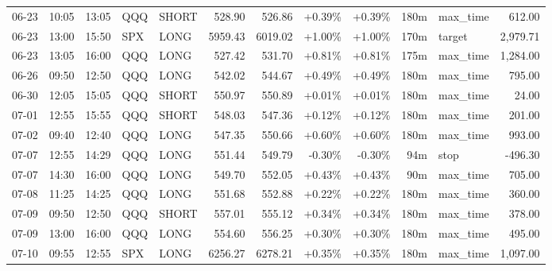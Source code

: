 \documentclass[11pt,a4paper,twoside]{article}
\begin{document}
\begin{center}
\begin{longtable}{>{\color{txtmain}}l l l l l r r r r r >{\color{txtmain}}l r}
06-23 & 10:05 & 13:05 & QQQ & SHORT & 528.90 & 526.86 & \textcolor{wingreen}{+0.39\%} & \textcolor{wingreen}{+0.39\%} & 180m & max\_time & \textcolor{wingreen}{612.00} \\
06-23 & 13:00 & 15:50 & SPX & LONG & 5959.43 & 6019.02 & \textcolor{wingreen}{+1.00\%} & \textcolor{wingreen}{+1.00\%} & 170m & target & \textcolor{wingreen}{2,979.71} \\
06-23 & 13:05 & 16:00 & QQQ & LONG & 527.42 & 531.70 & \textcolor{wingreen}{+0.81\%} & \textcolor{wingreen}{+0.81\%} & 175m & max\_time & \textcolor{wingreen}{1,284.00} \\
06-26 & 09:50 & 12:50 & QQQ & LONG & 542.02 & 544.67 & \textcolor{wingreen}{+0.49\%} & \textcolor{wingreen}{+0.49\%} & 180m & max\_time & \textcolor{wingreen}{795.00} \\
06-30 & 12:05 & 15:05 & QQQ & SHORT & 550.97 & 550.89 & \textcolor{wingreen}{+0.01\%} & \textcolor{wingreen}{+0.01\%} & 180m & max\_time & \textcolor{wingreen}{24.00} \\
07-01 & 12:55 & 15:55 & QQQ & SHORT & 548.03 & 547.36 & \textcolor{wingreen}{+0.12\%} & \textcolor{wingreen}{+0.12\%} & 180m & max\_time & \textcolor{wingreen}{201.00} \\
07-02 & 09:40 & 12:40 & QQQ & LONG & 547.35 & 550.66 & \textcolor{wingreen}{+0.60\%} & \textcolor{wingreen}{+0.60\%} & 180m & max\_time & \textcolor{wingreen}{993.00} \\
07-07 & 12:55 & 14:29 & QQQ & LONG & 551.44 & 549.79 & \textcolor{lossred}{-0.30\%} & \textcolor{lossred}{-0.30\%} & 94m & stop & \textcolor{lossred}{-496.30} \\
07-07 & 14:30 & 16:00 & QQQ & LONG & 549.70 & 552.05 & \textcolor{wingreen}{+0.43\%} & \textcolor{wingreen}{+0.43\%} & 90m & max\_time & \textcolor{wingreen}{705.00} \\
07-08 & 11:25 & 14:25 & QQQ & LONG & 551.68 & 552.88 & \textcolor{wingreen}{+0.22\%} & \textcolor{wingreen}{+0.22\%} & 180m & max\_time & \textcolor{wingreen}{360.00} \\
07-09 & 09:50 & 12:50 & QQQ & SHORT & 557.01 & 555.12 & \textcolor{wingreen}{+0.34\%} & \textcolor{wingreen}{+0.34\%} & 180m & max\_time & \textcolor{wingreen}{378.00} \\
07-09 & 13:00 & 16:00 & QQQ & LONG & 554.60 & 556.25 & \textcolor{wingreen}{+0.30\%} & \textcolor{wingreen}{+0.30\%} & 180m & max\_time & \textcolor{wingreen}{495.00} \\
07-10 & 09:55 & 12:55 & SPX & LONG & 6256.27 & 6278.21 & \textcolor{wingreen}{+0.35\%} & \textcolor{wingreen}{+0.35\%} & 180m & max\_time & \textcolor{wingreen}{1,097.00} \\

\end{longtable}
\end{center}
\end{document}
